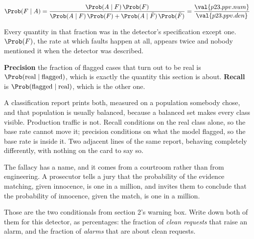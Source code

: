 \begin{fr}
\begin{ansblock}
\[ \Prob(F \mid A)
   = \frac{\Prob(A \mid F)\,\Prob(F)}
          {\Prob(A \mid F)\,\Prob(F) + \Prob(A \mid \bar{F})\,\Prob(\bar{F})}
   = \frac{\val{p23.ppv.num}}{\val{p23.ppv.den}} \]
\end{ansblock}

Every quantity in that fraction was in the detector's specification except one.
$\Prob(F)$, the rate at which faults happen at all, appears twice and nobody
mentioned it when the detector was described.

\begin{aibox}
\textbf{Precision} \dash{} the fraction of flagged cases that turn out to be
real \dash{} is $\Prob(\text{real} \mid \text{flagged})$, which is exactly the
quantity this section is about. \textbf{Recall} is
$\Prob(\text{flagged} \mid \text{real})$, which is the other one.

A classification report prints both, measured on a population somebody chose,
and that population is usually balanced, because a balanced set makes every
class visible. Production traffic is not. Recall conditions on the real class
alone, so the base rate cannot move it; precision conditions on what the model
flagged, so the base rate is inside it. Two adjacent lines of the same report,
behaving completely differently, with nothing on the card to say so.
\end{aibox}

\end{fr}

\begin{fr}
The fallacy has a name, and it comes from a courtroom rather than from
engineering. A prosecutor tells a jury that the probability of the evidence
matching, given innocence, is one in a million, and invites them to conclude
that the probability of innocence, given the match, is one in a million.

Those are the two conditionals from section 2's warning box. Write down both of
them for this detector, as percentages: the fraction of \emph{clean requests}
that raise an alarm, and the fraction of \emph{alarms} that are about clean
requests.
\dotline
\nextframe
\end{fr}

